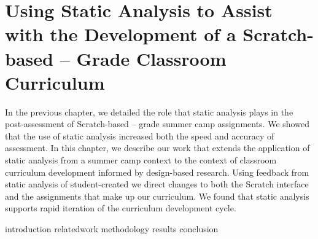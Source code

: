 \chapter{Using Static Analysis to Assist with the Development of a
  Scratch-based -- Grade Classroom Curriculum}
\label{chap:curriculum}

\def\currentprefix{curriculum}

In the previous chapter, we detailed the role that static analysis plays in the
post-assessment of Scratch-based -- grade summer camp
assignments. We showed that the use of static analysis increased both the speed
and accuracy of assessment. In this chapter, we describe our work that extends
the application of static analysis from a summer camp context to the context of
classroom curriculum development informed by design-based research. Using
feedback from static analysis of student-created  we direct changes
to both the Scratch interface and the assignments that make up our
curriculum. We found that static analysis supports rapid iteration of the
curriculum development cycle.

\iffull
{introduction}
{relatedwork}
{methodology}
{results}
{conclusion}
\fi

